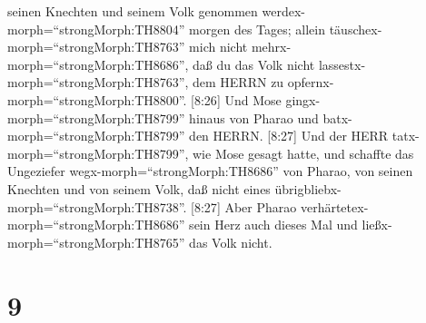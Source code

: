seinen Knechten und seinem Volk genommen
werdex-morph=``strongMorph:TH8804'' morgen des Tages; allein
täuschex-morph=``strongMorph:TH8763'' mich nicht
mehrx-morph=``strongMorph:TH8686'', daß du das Volk nicht
lassestx-morph=``strongMorph:TH8763'', dem HERRN zu
opfernx-morph=``strongMorph:TH8800''.  {[}8:26{]} Und Mose
gingx-morph=``strongMorph:TH8799'' hinaus von Pharao und
batx-morph=``strongMorph:TH8799'' den HERRN.  {[}8:27{]}
Und der HERR tatx-morph=``strongMorph:TH8799'', wie Mose gesagt hatte,
und schaffte das Ungeziefer wegx-morph=``strongMorph:TH8686'' von
Pharao, von seinen Knechten und von seinem Volk, daß nicht eines
übrigbliebx-morph=``strongMorph:TH8738''.  {[}8:27{]} Aber
Pharao verhärtetex-morph=``strongMorph:TH8686'' sein Herz auch dieses
Mal und ließx-morph=``strongMorph:TH8765'' das Volk nicht.

\hypertarget{section-8}{%
\section{9}\label{section-8}}

